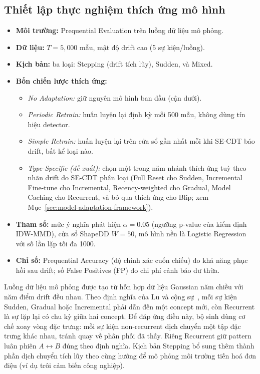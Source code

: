 \subsection{Thiết lập thực nghiệm thích ứng mô hình}
\begin{itemize}
	\item \textbf{Môi trường:} Prequential Evaluation trên luồng dữ liệu mô phỏng.
	\item \textbf{Dữ liệu:} $T = 5{,}000$ mẫu, mật độ drift cao (5 sự kiện/luồng).
	\item \textbf{Kịch bản:} ba loại: Stepping (drift tích lũy), Sudden, và Mixed.
	\item \textbf{Bốn chiến lược thích ứng:}
	\begin{itemize}
		\item \textit{No Adaptation:} giữ nguyên mô hình ban đầu (cận dưới).
		\item \textit{Periodic Retrain:} huấn luyện lại định kỳ mỗi 500 mẫu, không dùng tín hiệu detector.
		\item \textit{Simple Retrain:} huấn luyện lại trên cửa sổ gần nhất mỗi khi SE-CDT báo drift, bất kể loại nào.
		\item \textit{Type-Specific (đề xuất):} chọn một trong năm nhánh thích ứng tuỳ theo nhãn drift do SE-CDT phân loại (Full Reset cho Sudden, Incremental Fine-tune cho Incremental, Recency-weighted cho Gradual, Model Caching cho Recurrent, và bỏ qua thích ứng cho Blip; xem Mục~\ref{sec:model-adaptation-framework}).
	\end{itemize}
	\item \textbf{Tham số:} mức ý nghĩa phát hiện $\alpha = 0.05$ (ngưỡng p-value của kiểm định IDW-MMD), cửa sổ ShapeDD $W = 50$, mô hình nền là Logistic Regression với số lần lặp tối đa 1000.
	\item \textbf{Chỉ số:} Prequential Accuracy (độ chính xác cuốn chiếu) đo khả năng phục hồi sau drift; số False Positives (FP) đo chi phí cảnh báo dư thừa.
\end{itemize}

Luồng dữ liệu mô phỏng được tạo từ hỗn hợp dữ liệu Gaussian năm chiều với năm điểm drift đều nhau. Theo định nghĩa của Lu và cộng sự~\cite{lu2018learning}, mỗi sự kiện Sudden, Gradual hoặc Incremental phải dẫn đến một concept mới, còn Recurrent là sự lặp lại có chu kỳ giữa hai concept. Để đáp ứng điều này, bộ sinh dùng cơ chế xoay vòng đặc trưng: mỗi sự kiện non-recurrent dịch chuyển một tập đặc trưng khác nhau, tránh quay về phân phối đã thấy. Riêng Recurrent giữ pattern luân phiên $A \leftrightarrow B$ đúng theo định nghĩa. Kịch bản Stepping bổ sung thêm thành phần dịch chuyển tích lũy theo cùng hướng để mô phỏng môi trường tiến hoá đơn điệu (ví dụ trôi cảm biến công nghiệp).

